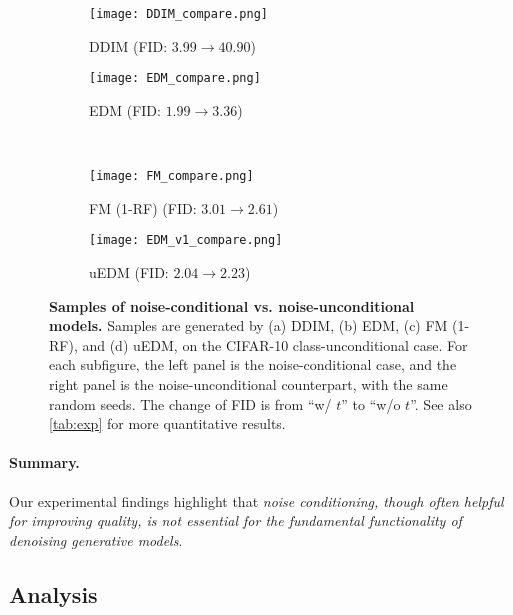 \begin{figure*}[!ht]
    \centering
    \begin{subfigure}[b]{0.47\textwidth}
        \texttt{[image: DDIM\_compare.png]}
        \caption{DDIM (FID: $3.99\to 40.90$)\\[1.4ex]}
    \end{subfigure}
    \hfill
    \begin{subfigure}[b]{0.47\textwidth}
        \texttt{[image: EDM\_compare.png]}
        \caption{EDM (FID: $1.99\to 3.36$)\\[1.4ex]}
    \end{subfigure}
    ~\\
    \begin{subfigure}[b]{0.47\textwidth}
        \texttt{[image: FM\_compare.png]}
        \caption{FM (1-RF) (FID: $3.01\to 2.61$)}
    \end{subfigure}
    \hfill
    \begin{subfigure}[b]{0.47\textwidth}
        \texttt{[image: EDM\_v1\_compare.png]}
        \caption{uEDM (FID: $2.04\to 2.23$)}
    \end{subfigure}
    \vspace{-.5em}
    \caption{\textbf{Samples of noise-conditional vs. noise-unconditional models.}
    Samples are generated by (a) DDIM, (b) EDM, (c) FM (1-RF), and (d) uEDM, on the CIFAR-10 class-unconditional case. For each subfigure, the left panel is the noise-conditional case, and the right panel is the noise-unconditional counterpart, with the same random seeds. The change of FID is from ``w/ $t$'' to ``w/o $t$''. See also \cref{tab:exp} for more quantitative results.}
    \label{fig:samples}
    \vspace{-.5em}
\end{figure*}

\paragraph{Summary.}
Our experimental findings highlight that \emph{noise conditioning, though often helpful for improving quality, is not essential for the fundamental functionality of denoising generative models}.



\subsection{Analysis}\label{subsec:analysis}

